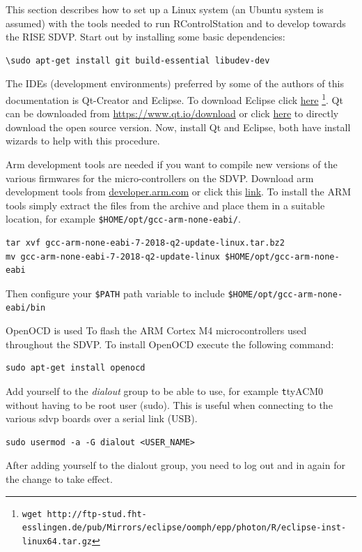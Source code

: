 \documentclass[12pt]{article} %
\begin{document}
This section describes how to set up a Linux system (an Ubuntu system
is assumed) with the tools needed to run RControlStation and to
develop towards the RISE SDVP. Start out by installing some basic
dependencies:

\begin{Verbatim}
\sudo apt-get install git build-essential libudev-dev
\end{Verbatim}

The IDEs (development environments) preferred by some of the authors of
this documentation is Qt-Creator and Eclipse. To download Eclipse
click
\href{http://ftp-stud.fht-esslingen.de/pub/Mirrors/eclipse/oomph/epp/photon/R/eclipse-inst-linux64.tar.gz}{here}
\footnote{\texttt{\tiny{wget
      http://ftp-stud.fht-esslingen.de/pub/Mirrors/eclipse/oomph/epp/photon/R/eclipse-inst-linux64.tar.gz}}}.
Qt can be downloaded from \url{https://www.qt.io/download} or click
\href{http://download.qt.io/official_releases/online_installers/qt-unified-linux-x64-online.run}{here}
to directly download the open source version. Now, install Qt and
Eclipse, both have install wizards to help with this procedure. 

Arm development tools are needed if you want to compile new versions
of the various firmwares for the micro-controllers on the
SDVP. Download arm development tools from \url{developer.arm.com} or
click this
\href{https://developer.arm.com/-/media/Files/downloads/gnu-rm/7-2018q2/gcc-arm-none-eabi-7-2018-q2-update-linux.tar.bz2?revision=bc2c96c0-14b5-4bb4-9f18-bceb4050fee7?product=GNU%20Arm%20Embedded%20Toolchain,64-bit,,Linux,7-2018-q2-update}{link}. 
  To install the ARM tools simply extract the files from the archive
  and place them in a suitable location, for example \texttt{\$HOME/opt/gcc-arm-none-eabi/}.
\begin{Verbatim}
tar xvf gcc-arm-none-eabi-7-2018-q2-update-linux.tar.bz2
mv gcc-arm-none-eabi-7-2018-q2-update-linux $HOME/opt/gcc-arm-none-eabi
\end{Verbatim} 
Then configure your \texttt{\$PATH} path variable to include \texttt{\$HOME/opt/gcc-arm-none-eabi/bin}

OpenOCD is used To flash the ARM Cortex M4 microcontrollers used throughout the SDVP.
To install OpenOCD execute the following command: 
\begin{Verbatim}
sudo apt-get install openocd
\end{Verbatim} 

Add yourself to the {\em dialout} group to be able to use, for example
{\texttt ttyACM0} without having to be root user (sudo). This is useful when connecting to
the various sdvp boards over a serial link (USB). 
\begin{Verbatim}
sudo usermod -a -G dialout <USER_NAME> 
\end{Verbatim}
After adding yourself to the dialout group, you need to log out and in again
for the change to take effect. 
\end{document}
